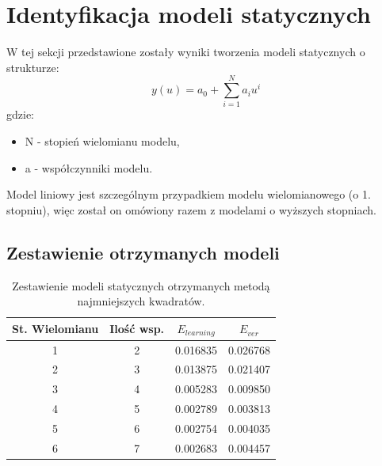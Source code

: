 \section{Identyfikacja modeli statycznych}
W tej sekcji przedstawione zostały wyniki tworzenia modeli statycznych o strukturze:
\begin{equation}
y(u)=a_{0}+\sum_{i=1}^{N}a_{i}u^{i}
\end{equation}
gdzie:
\begin{itemize}
\item N - stopień wielomianu modelu,
\item a - współczynniki modelu.
\end{itemize}
Model liniowy jest szczególnym przypadkiem modelu wielomianowego (o 1. stopniu), więc został on omówiony razem z modelami o wyższych stopniach.
\subsection{Zestawienie otrzymanych modeli}
\begin{table}[H]
\centering
\begin{tabular}{|c|c|c|c|}
\hline
St. Wielomianu & Ilość wsp. & $E_{learning}$ & $E_{ver}$ \\ \hline
1              & 2             & 0.016835              & 0.026768         \\ \hline
2              & 3             & 0.013875              & 0.021407         \\ \hline
3              & 4             & 0.005283              & 0.009850         \\ \hline
4              & 5             & 0.002789              & 0.003813         \\ \hline
5              & 6             & 0.002754              & 0.004035         \\ \hline
6              & 7             & 0.002683              & 0.004457         \\ \hline
\end{tabular}
\caption{Zestawienie modeli statycznych otrzymanych metodą najmniejszych kwadratów.}
\end{table}
